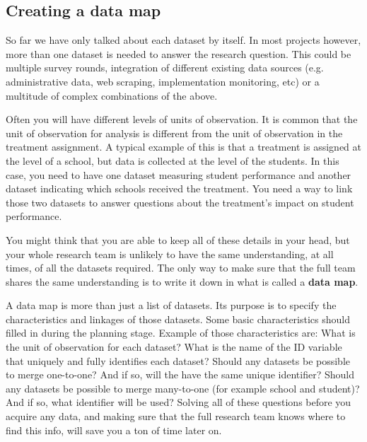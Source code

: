 \subsection{Creating a data map}

So far we have only talked about each dataset by itself.
In most projects however, more than one dataset is needed to answer the research question.
This could be multiple survey rounds, 
integration of different existing data sources (e.g. administrative data,
web scraping, implementation monitoring, etc)
or a multitude of complex combinations of the above.

Often you will have different levels of units of observation.
It is common that the unit of observation for analysis
is different from the unit of observation in the treatment assignment.
A typical example of this is that a treatment is assigned at the level of a school,
but data is collected at the level of the students.
In this case, you need to have one dataset
measuring student performance
and another dataset indicating which schools received the treatment.
You need a way to link those two datasets
to answer questions about the treatment's impact on student performance.

You might think that you are able to keep all of these details in your head,
but your whole research team is unlikely to have the same understanding,
at all times, of all the datasets required.
The only way to make sure that the full team shares the same understanding
is to write it down in what is called a \textbf{data map}.

A data map is more than just a list of datasets.
Its purpose is to specify the characteristics and linkages of those datasets.
Some basic characteristics should filled in during the planning stage.
Example of those characteristics are:
What is the unit of observation for each dataset?
What is the name of the ID variable that uniquely and fully identifies each dataset?
Should any datasets be possible to merge one-to-one?
And if so, will the have the same unique identifier?
Should any datasets be possible to merge many-to-one (for example school and student)?
And if so, what identifier will be used?
Solving all of these questions before you acquire any data,
and making sure that the full research team knows where to find this info,
will save you a ton of time later on.

